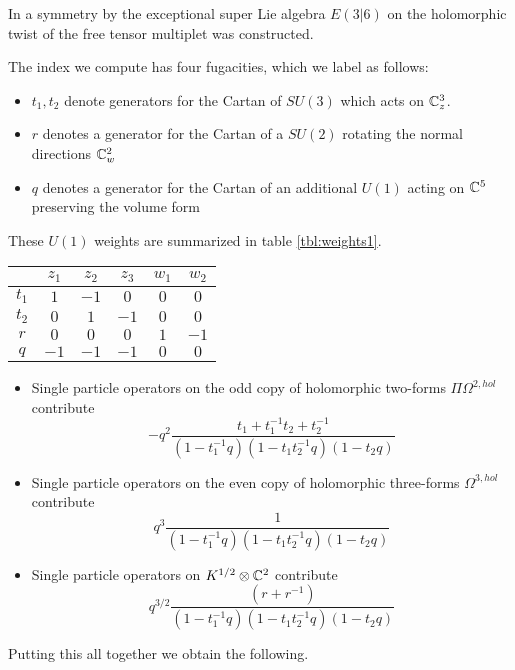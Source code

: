 \documentclass[11pt]{amsart}
\begin{document}
\parsec

In \cite{SW6d} a symmetry by the exceptional super Lie algebra $E(3|6)$ on the holomorphic twist of the free tensor multiplet was constructed.

\parsec

The index we compute has four fugacities, which we label as follows:
\begin{itemize}
  \item $t_{1}, t_{2}$ denote generators for the Cartan of $SU(3)$ which acts on $\mathbb{C}^{3}_{z}$.
  \item $r$ denotes a generator for the Cartan of a $SU(2)$ rotating the normal directions $\mathbb{C}^{2}_{w}$
  \item $q$ denotes a generator for the Cartan of an additional $U(1)$ acting on $\mathbb{C}^{5}$ preserving the volume form
\end{itemize}
These $U(1)$ weights are summarized in table \ref{tbl:weights1}.

\begin{center}
\begin{tabular}{c c c c c c}
  & $z_{1}$ & $z_{2}$ & $z_{3}$ & $w_{1}$ & $w_{2}$ \\
  \hline
  $t_{1}$ & $1$ & $-1$ & $0$ & $0$ & $0$ \\
  $t_{2}$ & $0$ & $1$ & $-1$ & $0$ & $0$ \\
  $r$ & $0$ & $0$ & $0$ & $1$ & $-1$ \\
  $q$ & $-1$ & $-1$ & $-1$ & $0$ & $0$
\end{tabular}
\end{center}

\parsec

\begin{itemize}
\item Single particle operators on the odd copy of holomorphic two-forms $\Pi \Omega^{2,hol}$ contribute
\[
- q^2 \frac{t_1  + t_1^{-1} t_2  + t_2^{-1} }{(1-t_1^{-1}q) (1-t_1 t_2^{-1} q) (1-t_2 q)} 
\]
\item Single particle operators on the even copy of holomorphic three-forms $\Omega^{3,hol}$ contribute
\[
q^3 \frac{1}{(1-t_1^{-1}q) (1-t_1 t_2^{-1} q) (1-t_2 q)} 
\]
\item Single particle operators on $K^{1/2} \otimes \mathbb{C}^2$ contribute
\[
q^{3/2}\frac{(r + r^{-1})}{(1-t_1^{-1}q) (1-t_1 t_2^{-1} q) (1-t_2 q)}
\]
\end{itemize}

Putting this all together we obtain the following.
\end{document}
